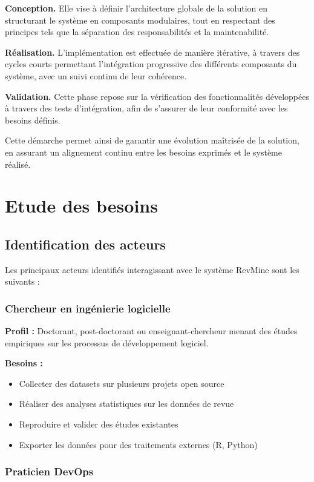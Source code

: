 \textbf{Conception.} Elle vise à définir l’architecture globale de la solution en structurant le système en composants modulaires, tout en respectant des principes tels que la séparation des responsabilités et la maintenabilité.

\textbf{Réalisation.} L’implémentation est effectuée de manière itérative, à travers des cycles courts permettant l’intégration progressive des différents composants du système, avec un suivi continu de leur cohérence.

\textbf{Validation.} Cette phase repose sur la vérification des fonctionnalités développées à travers des tests d’intégration, afin de s’assurer de leur conformité avec les besoins définis.

Cette démarche permet ainsi de garantir une évolution maîtrisée de la solution, en assurant un alignement continu entre les besoins exprimés et le système réalisé.

\section{Etude des besoins}
\subsection{Identification des acteurs}
Les principaux acteurs identifiés interagissant avec le système RevMine sont les suivants :

\subsubsection*{Chercheur en ingénierie logicielle}

\textbf{Profil :} Doctorant, post-doctorant ou enseignant-chercheur menant des études empiriques sur les processus de développement logiciel.

\textbf{Besoins :}
\begin{itemize}
    \item Collecter des datasets sur plusieurs projets open source
    \item Réaliser des analyses statistiques sur les données de revue
    \item Reproduire et valider des études existantes
    \item Exporter les données pour des traitements externes (R, Python)
\end{itemize}

\subsubsection*{Praticien DevOps}

